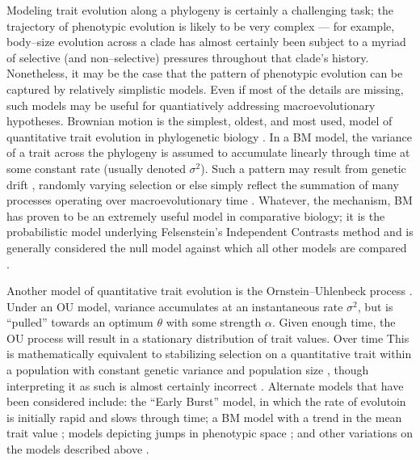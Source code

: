 \documentclass[a4paper,12pt]{article}
\begin{document}
Modeling trait evolution along a phylogeny is certainly a challenging task; the trajectory of phenotypic evolution is likely to be very complex --- for example, body--size evolution across a clade has almost certainly been subject to a myriad of selective (and non--selective) pressures throughout that clade's history. Nonetheless, it may be the case that the pattern of phenotypic evolution can be captured by relatively simplistic models. Even if most of the details are missing, such models may be useful for quantiatively addressing macroevolutionary hypotheses. Brownian motion is the simplest, oldest, and most used, model of quantitative trait evolution in phylogenetic biology  \citep[BM;][]{Edwards1964, Felsenstein1973, Thompson1975}. In a BM model, the variance of a trait across the phylogeny is assumed to accumulate linearly through time at some constant rate (usually denoted $\sigma^2$). Such a pattern may result from genetic drift \citep{Lande1976, HansenMartins1996}, randomly varying selection \citep{Felsenstein1973, Felsenstein1988} or else simply reflect the summation of many processes operating over macroevolutionary time \citep{HansenMartins1996, Uyeda2011, PennellHarmon, PennellPE}. Whatever, the mechanism, BM has proven to be an extremely useful model in comparative biology; it is the probabilistic model underlying Felsenstein's Independent Contrasts method \citep[][see below]{Felsenstein1985} and is generally considered the null model against which all other models are compared \citep{Blomberg2003}. %
 
Another model of quantitative trait evolution is the Ornstein--Uhlenbeck process \citep[OU;][]{Felsenstein1988, Hansen1997}. Under an OU model, variance accumulates at an instantaneous rate $\sigma^2$, but is ``pulled'' towards an optimum $\theta$ with some strength $\alpha$. Given enough time, the OU process will result in a stationary distribution of trait values. Over time This is mathematically equivalent to stabilizing selection on a quantitative trait within a population with constant genetic variance and population size \citep{Lande1976}, though interpreting it as such is almost certainly incorrect \citep{HansenMartins1996}.  
Alternate models that have been considered include: the ``Early Burst'' \citep[EB;][]{Blomberg2003, Harmon2010, SlaterPennell} model, in which the rate of evolutoin is initially rapid and slows through time; a BM model with a trend in the mean trait value \citep{Hunt2006}; models depicting jumps in phenotypic space \citep{Landis2012, Eastmanlevy}; and other variations on the models described above \citep[e.g.][]{Pagel1997, Pagel1999, ButlerKing2004, Omeara2006, Eastman2011, Beaulieu2012, SlaterMEE}. 
\end{document}
